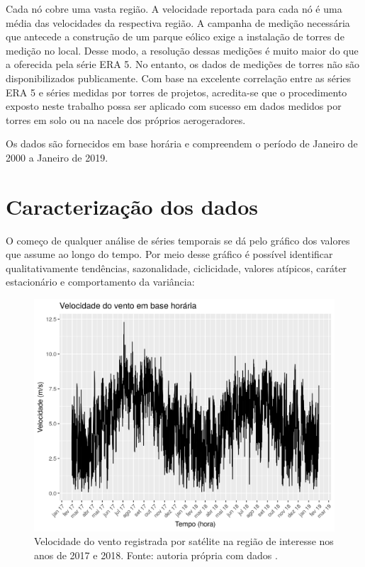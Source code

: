 \documentclass[
	12pt,				%
	openright,			%
	oneside,			%
	a4paper,			%
	english,			%
	french,				%
	spanish,			%
	brazil				%
	]{abntex2}
\begin{document}
Cada nó cobre uma vasta região. A velocidade reportada para cada nó é uma média das velocidades da respectiva região. A campanha de medição necessária que antecede a construção de um parque eólico exige a instalação de torres de medição no local. Desse modo, a resolução dessas medições é muito maior do que a oferecida pela série ERA 5. No entanto, os dados de medições de torres não são disponibilizados publicamente. Com base na excelente correlação entre as séries ERA 5 e séries medidas por torres de projetos, acredita-se que o procedimento exposto neste trabalho possa ser aplicado com sucesso em dados medidos por torres em solo ou na nacele dos próprios aerogeradores.



Os dados são fornecidos em base horária e compreendem o período de Janeiro de 2000 a Janeiro de 2019. 

\chapter{Caracterização dos dados}

O começo de qualquer análise de séries temporais se dá pelo gráfico dos valores que assume ao longo do tempo. Por meio desse gráfico é possível identificar qualitativamente tendências, sazonalidade, ciclicidade, valores atípicos, caráter estacionário e comportamento da variância:

\begin{figure}[h]
    \centering
	\includegraphics[width=\textwidth]{entire_series_hourly_basis.png}
	\caption{Velocidade do vento registrada por satélite na região de interesse nos anos de 2017 e 2018. Fonte: autoria própria com dados \cite{era5}.}
\end{figure}
\FloatBarrier
\end{document}
